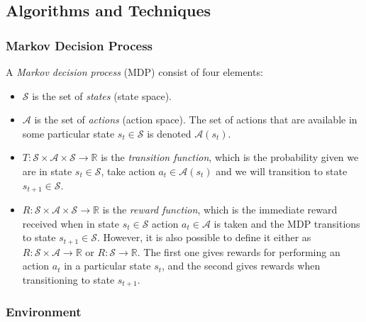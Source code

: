 \documentclass{article}
\begin{document}
\subsection{Algorithms and Techniques}

\subsubsection{Markov Decision Process}

A \emph{Markov decision process} (MDP) consist of four elements:

\begin{itemize}

    \item $\mathcal{S}$ is the set of \emph{states} (state space).

    \item $\mathcal{A}$ is the set of \emph{actions} (action space). The set of actions that are
        available in some particular state $s_t \in \mathcal{S}$ is denoted $\mathcal{A}(s_t)$.

    \item $ T : \mathcal{S} \times \mathcal{A} \times \mathcal{S} \to \mathbb{R}$ is the
      \emph{transition function}, which is the probability given we are in state $s_t \in
      \mathcal{S}$, take action $a_t \in \mathcal{A}(s_t)$ and we will transition to state $s_{t+1}
      \in \mathcal{S}$.

    \item $ R : \mathcal{S} \times \mathcal{A} \times \mathcal{S} \to \mathbb{R}$ is the
      \emph{reward function}, which is the immediate reward received when in state $s_t \in
      \mathcal{S}$ action $a_t \in \mathcal{A}$ is taken and the MDP transitions to state $s_{t+1}
      \in \mathcal{S}$. However, it is also possible to define it either as $ R : \mathcal{S} \times
      \mathcal{A} \to \mathbb{R}$ or $R : \mathcal{S} \to \mathbb{R}$. The first one gives rewards
      for performing an action $a_t$ in a particular state $s_t$, and the second gives rewards when
      transitioning to state $s_{t+1}$.

\end{itemize}

\subsubsection{Environment}
\end{document}
